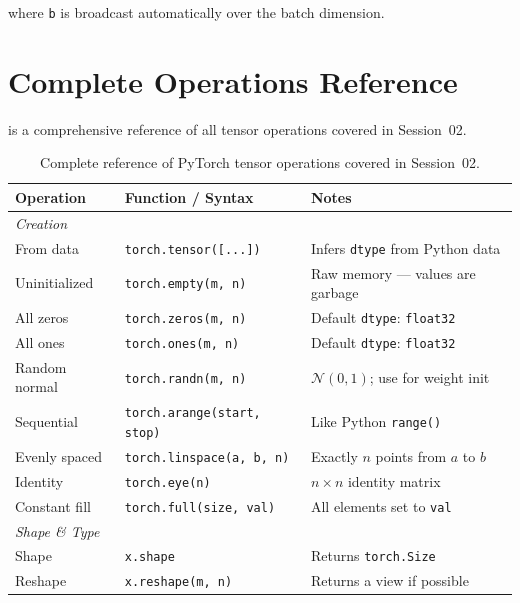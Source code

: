\documentclass[12pt,a4paper]{article}
\newcommand{\tbf}[1]{\textbf{#1}}
\newcommand{\ttt}[1]{\texttt{#1}}
\begin{document}
where \ttt{b} is broadcast automatically over the batch dimension.

\section{Complete Operations Reference}
\label{sec:reference}

 is a comprehensive reference of all tensor operations
covered in Session~02.

\begin{table}[ht]
  \centering
  \caption{Complete reference of PyTorch tensor operations covered in Session~02.}
  \label{tab:ops-reference}
  \begin{tabularx}{\linewidth}{l l X}
    \toprule
    \tbf{Operation} & \tbf{Function / Syntax} & \tbf{Notes} \\
    \midrule
    \multicolumn{3}{l}{\itshape Creation} \\
    \midrule
    From data        & \ttt{torch.tensor([...])}       & Infers \ttt{dtype} from Python data \\
    Uninitialized    & \ttt{torch.empty(m, n)}         & Raw memory --- values are garbage \\
    All zeros        & \ttt{torch.zeros(m, n)}         & Default \ttt{dtype}: \ttt{float32} \\
    All ones         & \ttt{torch.ones(m, n)}          & Default \ttt{dtype}: \ttt{float32} \\
    Random normal    & \ttt{torch.randn(m, n)}         & $\mathcal{N}(0,1)$; use for weight init \\
    Sequential       & \ttt{torch.arange(start, stop)} & Like Python \ttt{range()} \\
    Evenly spaced    & \ttt{torch.linspace(a, b, n)}   & Exactly $n$ points from $a$ to $b$ \\
    Identity         & \ttt{torch.eye(n)}              & $n \times n$ identity matrix \\
    Constant fill    & \ttt{torch.full(size, val)}     & All elements set to \ttt{val} \\
    \midrule
    \multicolumn{3}{l}{\itshape Shape \& Type} \\
    \midrule
    Shape            & \ttt{x.shape}                   & Returns \ttt{torch.Size} \\
    Reshape          & \ttt{x.reshape(m, n)}           & Returns a view if possible \\

\end{tabularx}
\end{table}
\end{document}
